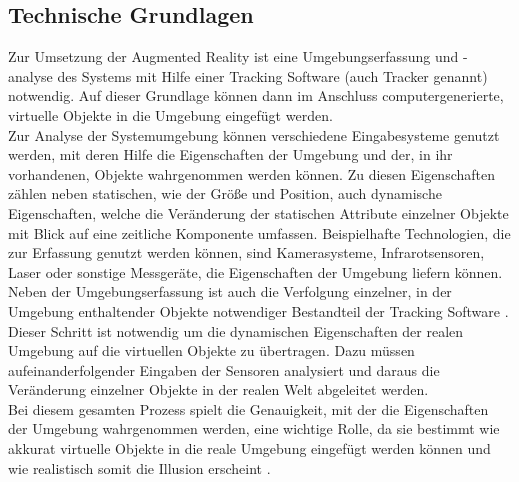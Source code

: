 \subsection{Technische Grundlagen}
Zur Umsetzung der Augmented Reality ist eine Umgebungserfassung und -analyse des Systems mit Hilfe einer Tracking Software (auch Tracker genannt) notwendig. Auf dieser Grundlage können dann im Anschluss computergenerierte, virtuelle Objekte in die Umgebung eingefügt werden. \citep[S. 25]{mehler-bicher:augmented-reality}\\
Zur Analyse der Systemumgebung können verschiedene Eingabesysteme genutzt werden, mit deren Hilfe die Eigenschaften der Umgebung und der, in ihr vorhandenen, Objekte wahrgenommen werden können. Zu diesen Eigenschaften zählen neben statischen, wie der Größe und Position, auch dynamische Eigenschaften, welche die Veränderung der statischen Attribute einzelner Objekte mit Blick auf eine zeitliche Komponente umfassen. Beispielhafte Technologien, die zur Erfassung genutzt werden können, sind Kamerasysteme, Infrarotsensoren, Laser oder sonstige Messgeräte, die Eigenschaften der Umgebung liefern können. \citep[S. 22]{tab:augmented-reality} \\
Neben der Umgebungserfassung ist auch die Verfolgung einzelner, in der Umgebung enthaltender Objekte notwendiger Bestandteil der Tracking Software \citep[S. 26]{mehler-bicher:augmented-reality}. Dieser Schritt ist notwendig um die dynamischen Eigenschaften der realen Umgebung auf die virtuellen Objekte zu übertragen. Dazu müssen aufeinanderfolgender Eingaben der Sensoren analysiert und daraus die Veränderung einzelner Objekte in der realen Welt abgeleitet werden.\\
Bei diesem gesamten Prozess spielt die Genauigkeit, mit der die Eigenschaften der Umgebung wahrgenommen werden, eine wichtige Rolle, da sie bestimmt wie akkurat virtuelle Objekte in die reale Umgebung eingefügt werden können und wie realistisch somit die Illusion erscheint \citep[S. 2]{klein:visual-tracking}.

